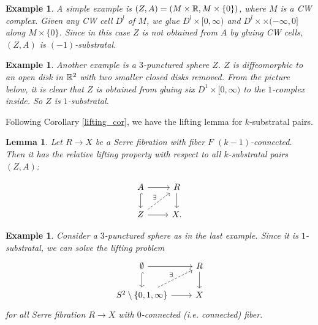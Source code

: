 \documentclass{article}
\newtheorem{lemma}[theorem]{Lemma}
\newtheorem{example}[theorem]{Example}
\newtheorem{proposed work}[theorem]{Proposed Work}
\begin{document}
\begin{example}
A simple example is $(Z,A) = (M\times\mathbb R,M\times\{0\})$, where $M$ is a CW complex. Given any CW cell $D^l$ of $M$, we glue $D^l\times [0,\infty)$ and $D^l\times\times (-\infty,0]$ along $M\times \{0\}$. Since in this case $Z$ is not obtained from $A$ by gluing CW cells, $(Z,A)$ is $(-1)$-substratal.
\end{example}

\begin{example}
Another example is a $3$-punctured sphere $Z$. $Z$ is diffeomorphic to an open disk in $\mathbb R^2$ with two smaller closed disks removed. From the picture below, it is clear that $Z$ is obtained from gluing six $D^1\times [0,\infty)$ to the $1$-complex inside. So $Z$ is $1$-substratal.
\begin{figure}[h]
\centering
\end{figure}
\end{example}

Following Corollary \ref{lifting_cor}, we have the lifting lemma for $k$-substratal pairs.

\begin{lemma}
\label{substratal_lift}
Let $R\to X$ be a Serre fibration with fiber $F$ $(k-1)$-connected. Then it has the relative lifting property with respect to all $k$-substratal pairs $(Z, A)$:

\begin{equation*}
\begin{tikzcd}
A \arrow[r] \arrow[hookrightarrow]{d}
& R \arrow[d]
\\
Z \arrow[r] \arrow[dashed,ur,"\exists"]
& X.
\end{tikzcd}
\end{equation*}
\end{lemma}

\begin{example}
Consider a $3$-punctured sphere as in the last example. Since it is $1$-substratal, we can solve the lifting problem
\begin{equation*}
\begin{tikzcd}
\emptyset \arrow[r] \arrow[hookrightarrow]{d}
& R \arrow[d]
\\
S^2\setminus\{0,1,\infty\} \arrow[r] \arrow[dashed,ur,"\exists"]
& X
\end{tikzcd}
\end{equation*}
for all Serre fibration $R\to X$ with $0$-connected (i.e. connected) fiber.
\end{example}
\end{document}
